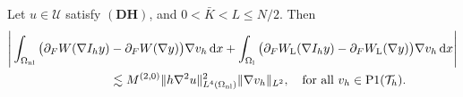 \begin{theorem}\label{Internal forces of continuum region}
	Let $u \in \mathscr{U}$ satisfy $(\mathbf{DH})$, and $0<\bar{K} <L \le N/2$. Then
	\begin{equation*}
		\begin{aligned}
			\Bigg \vert \int_{\Omega_{{\rm nl}}} \big(\partial_{F} W(\nabla I_{h} y) &- \partial_{F} W(\nabla y)\big) \nabla v_{h} \, \text{d} x + \int_{\Omega_{{\rm l}}} \big(\partial_{F} W_{{\rm L}} (\nabla I_{h} y) - \partial_{F} W_{{\rm L}} (\nabla y)\big) \nabla v_{h} \,\text{d} x \Bigg \vert \\
			&\lesssim M^{(2,0)}\Vert h\nabla^{2}u\Vert^{2}_{L^{4}(\Omega_{{\rm nl}})} \Vert \nabla v_{h} \Vert_{L^{2}}, \quad \text{for all}\  v_{h} \in \text{P1}(\mathcal{T}_{h}).\\
		\end{aligned}
	\end{equation*}
\end{theorem}

